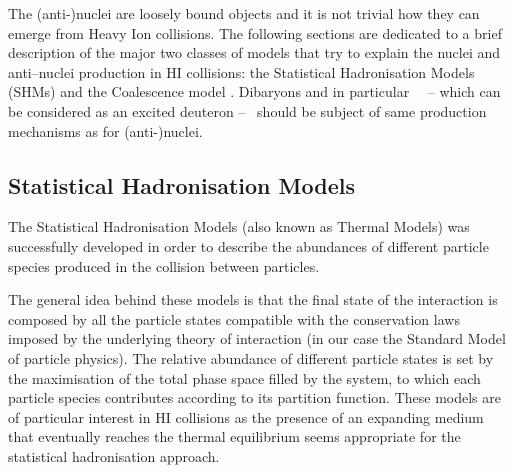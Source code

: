 The (anti-)nuclei are loosely bound objects and it is not trivial how they can emerge from Heavy 
Ion collisions. 
The following sections are dedicated to a brief description of the major two classes of models
that try to explain the nuclei and anti–nuclei production in HI collisions: the Statistical 
Hadronisation Models (SHMs) and the Coalescence model \cite{deuprod}.
Dibaryons and in particular \dst \ \ -- which can be considered as an excited deuteron -- \ should 
be subject of same production mechanisms as for (anti-)nuclei.

%
\subsection{Statistical Hadronisation Models} \label{sec:1.4.1}

The Statistical Hadronisation Models (also known as Thermal Models) was successfully developed
in order to describe the abundances of different particle species produced in the collision 
between particles.

The general idea behind these models is that the final state of the interaction is composed by
all the particle states compatible with the conservation laws imposed by the underlying theory 
of interaction (in our case the Standard Model of particle physics). 
The relative abundance of different particle states is set by the maximisation of the total phase
space filled by the system, to which each particle species contributes according to its partition 
function. These models are of particular interest in HI collisions as the presence of an expanding 
medium that eventually reaches the thermal equilibrium seems appropriate for the statistical
hadronisation approach. 

